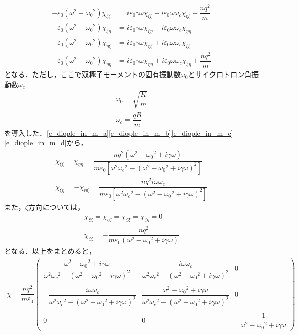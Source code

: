 \begin{align}
  - \varepsilon_0(\omega^2 - {\omega_0}^2)\chi_{\xi\xi} &= i\varepsilon_0\gamma\omega\chi_{\xi\xi} - i\varepsilon_0\omega\omega_c\chi_{\eta\xi}+\dfrac{nq^2}{m} \label{e_diople_in_m_a} \\
  - \varepsilon_0(\omega^2 - {\omega_0}^2)\chi_{\xi\eta} &= i\varepsilon_0\gamma\omega\chi_{\xi\eta} - i\varepsilon_0\omega\omega_c\chi_{\eta\eta} \label{e_diople_in_m_b} \\
  - \varepsilon_0(\omega^2 - {\omega_0}^2)\chi_{\eta\xi} &= i\varepsilon_0\gamma\omega\chi_{\eta\xi}+i\varepsilon_0\omega\omega_c\chi_{\xi\xi} \label{e_diople_in_m_c} \\
  - \varepsilon_0(\omega^2 - {\omega_0}^2)\chi_{\eta\eta} &= i\varepsilon_0\gamma\omega\chi_{\eta\eta}+i\varepsilon_0\omega\omega_c\chi_{\xi\eta}+\dfrac{nq^2}{m} \label{e_diople_in_m_d}
\end{align}
となる．ただし，ここで双極子モーメントの固有振動数$\omega_0$とサイクロトロン角振動数$\omega_c$
\begin{align}
  \omega_0=\sqrt{\dfrac{K}{m}} \\
  \omega_c=\dfrac{qB}{m}
\end{align}
を導入した．\eqref{e_diople_in_m_a}\eqref{e_diople_in_m_b}\eqref{e_diople_in_m_c}\eqref{e_diople_in_m_d}から，
\begin{align}
  \chi_{\xi\xi}=\chi_{\eta\eta}=\dfrac{nq^2(\omega^2 - {\omega_0}^2+i\gamma\omega)}{m\varepsilon_0\left[\omega^2{\omega_c}^2 - (\omega^2 - {\omega_0}^2+i\gamma\omega)^2\right]} \\
  \chi_{\xi\eta}= - \chi_{\eta\xi}=\dfrac{nq^2i\omega\omega_c}{m\varepsilon_0\left[\omega^2{\omega_c}^2 - (\omega^2 - {\omega_0}^2+i\gamma\omega)^2\right]}
\end{align}
また，$\zeta$方向については，
\begin{align}
  \chi_{\xi\zeta}=\chi_{\eta\zeta}=\chi_{\zeta\xi}=\chi_{\zeta\eta}=0 \\
  \chi_{\zeta\zeta}= - \dfrac{nq^2}{m\varepsilon_0(\omega^2 - {\omega_0}^2+i\gamma\omega)}
\end{align}
となる．以上をまとめると，
\begin{align}
  \chi =
  \dfrac{nq^2}{m\varepsilon_0}\left(
  \begin{array}{ccc}
    \dfrac{\omega^2 - {\omega_0}^2+i\gamma\omega}{\omega^2{\omega_c}^2 - (\omega^2 - {\omega_0}^2+i\gamma\omega)^2} & \dfrac{i\omega\omega_c}{\omega^2{\omega_c}^2 - (\omega^2 - {\omega_0}^2+i\gamma\omega)^2} & 0 \\ \\
    - \dfrac{i\omega\omega_c}{\omega^2{\omega_c}^2 - (\omega^2 - {\omega_0}^2+i\gamma\omega)^2} &  \dfrac{\omega^2 - {\omega_0}^2+i\gamma\omega}{\omega^2{\omega_c}^2 - (\omega^2 - {\omega_0}^2+i\gamma\omega)^2} & 0 \\ \\
    0 & 0 &  - \dfrac{1}{\omega^2 - {\omega_0}^2+i\gamma\omega}
  \end{array}
  \right)
  \label{e_diople_in_m_tensor}
\end{align}

